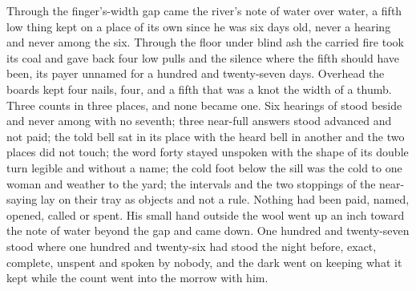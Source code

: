 Through the finger's-width gap came the river's note of water over water, a fifth low thing kept on a place of its own since he was six days old, never a hearing and never among the six. Through the floor under blind ash the carried fire took its coal and gave back four low pulls and the silence where the fifth should have been, its payer unnamed for a hundred and twenty-seven days. Overhead the boards kept four nails, four, and a fifth that was a knot the width of a thumb. Three counts in three places, and none became one. Six hearings of  stood beside and never among with no seventh; three near-full answers stood advanced and not paid; the told bell sat in its place with the heard bell in another and the two places did not touch; the word forty stayed unspoken with the shape of its double turn legible and without a name; the cold foot below the sill was the cold to one woman and weather to the yard; the intervals and the two stoppings of the near-saying lay on their tray as objects and not a rule. Nothing had been paid, named, opened, called or spent. His small hand outside the wool went up an inch toward the note of water beyond the gap and came down. One hundred and twenty-seven stood where one hundred and twenty-six had stood the night before, exact, complete, unspent and spoken by nobody, and the dark went on keeping what it kept while the count went into the morrow with him.
